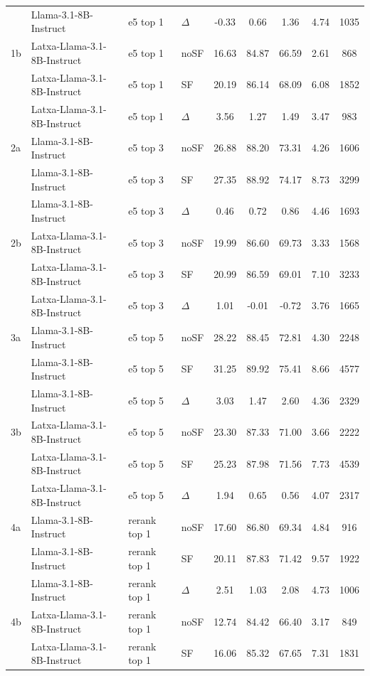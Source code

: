 \begin{scriptsize}
\begin{longtable}{l l l l c c c c c}
 & Llama-3.1-8B-Instruct & e5 top 1 & $\Delta$ & -0.33 & 0.66 & 1.36 & 4.74 & 1035 \\
1b & Latxa-Llama-3.1-8B-Instruct & e5 top 1 & noSF & 16.63 & 84.87 & 66.59 & 2.61 & 868 \\
 & Latxa-Llama-3.1-8B-Instruct & e5 top 1 & SF & 20.19 & 86.14 & 68.09 & 6.08 & 1852 \\
 & Latxa-Llama-3.1-8B-Instruct & e5 top 1 & $\Delta$ & 3.56 & 1.27 & 1.49 & 3.47 & 983 \\
\dmidrule
2a & Llama-3.1-8B-Instruct & e5 top 3 & noSF & 26.88 & 88.20 & 73.31 & 4.26 & 1606 \\
 & Llama-3.1-8B-Instruct & e5 top 3 & SF & 27.35 & 88.92 & 74.17 & 8.73 & 3299 \\
 & Llama-3.1-8B-Instruct & e5 top 3 & $\Delta$ & 0.46 & 0.72 & 0.86 & 4.46 & 1693 \\
2b & Latxa-Llama-3.1-8B-Instruct & e5 top 3 & noSF & 19.99 & 86.60 & 69.73 & 3.33 & 1568 \\
 & Latxa-Llama-3.1-8B-Instruct & e5 top 3 & SF & 20.99 & 86.59 & 69.01 & 7.10 & 3233 \\
 & Latxa-Llama-3.1-8B-Instruct & e5 top 3 & $\Delta$ & 1.01 & -0.01 & -0.72 & 3.76 & 1665 \\
\dmidrule
3a & Llama-3.1-8B-Instruct & e5 top 5 & noSF & 28.22 & 88.45 & 72.81 & 4.30 & 2248 \\
 & Llama-3.1-8B-Instruct & e5 top 5 & SF & 31.25 & 89.92 & 75.41 & 8.66 & 4577 \\
 & Llama-3.1-8B-Instruct & e5 top 5 & $\Delta$ & 3.03 & 1.47 & 2.60 & 4.36 & 2329 \\
3b & Latxa-Llama-3.1-8B-Instruct & e5 top 5 & noSF & 23.30 & 87.33 & 71.00 & 3.66 & 2222 \\
 & Latxa-Llama-3.1-8B-Instruct & e5 top 5 & SF & 25.23 & 87.98 & 71.56 & 7.73 & 4539 \\
 & Latxa-Llama-3.1-8B-Instruct & e5 top 5 & $\Delta$ & 1.94 & 0.65 & 0.56 & 4.07 & 2317 \\
\dmidrule
4a & Llama-3.1-8B-Instruct & rerank top 1 & noSF & 17.60 & 86.80 & 69.34 & 4.84 & 916 \\
 & Llama-3.1-8B-Instruct & rerank top 1 & SF & 20.11 & 87.83 & 71.42 & 9.57 & 1922 \\
 & Llama-3.1-8B-Instruct & rerank top 1 & $\Delta$ & 2.51 & 1.03 & 2.08 & 4.73 & 1006 \\
4b & Latxa-Llama-3.1-8B-Instruct & rerank top 1 & noSF & 12.74 & 84.42 & 66.40 & 3.17 & 849 \\
 & Latxa-Llama-3.1-8B-Instruct & rerank top 1 & SF & 16.06 & 85.32 & 67.65 & 7.31 & 1831 \\

\end{longtable}
\end{scriptsize}
